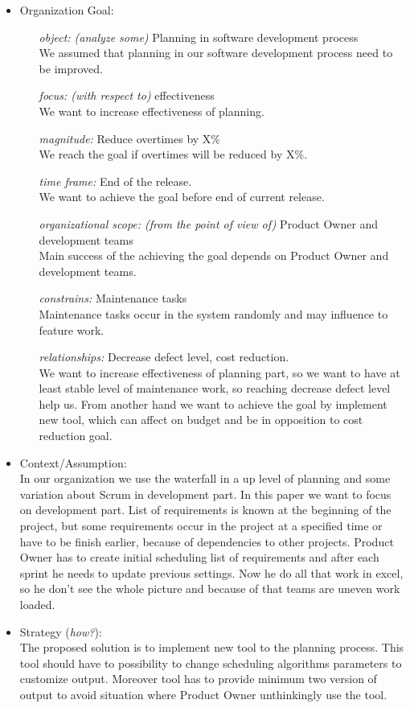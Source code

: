 \begin{itemize}
\item Organization Goal:
  \begin{itemize}
  \item[\textit{object: (analyze some)}] Planning in software development process \\
  We assumed that planning in our software development process need to be improved.
  \item[\textit{focus: (with respect to)}] effectiveness \\ We want to increase effectiveness of planning. 
  \item[\textit{magnitude:}] Reduce overtimes by X\% \\
  We reach the goal if overtimes will be reduced by X\%.
  \item[\textit{time frame:}] End of the release.\\
  We want to achieve the goal before end of current release.
  \item[\textit{organizational scope: (from the point of view of)}] Product Owner and development teams \\
  Main success of the achieving the goal depends on Product Owner and development teams.
  \item[\textit{constrains:}] Maintenance tasks \\
  Maintenance tasks occur in the system randomly and may influence to feature work.
  \item[\textit{relationships:}] Decrease defect level, cost reduction. \\
  We want to increase effectiveness of planning part, so we want to have at least stable level of maintenance work, so reaching decrease defect level help us. From another hand we want to achieve the goal by implement new tool, which can affect on budget and be in opposition to cost reduction goal.
  \end{itemize}
\item Context/Assumption: \\
In our organization we use the waterfall in a up level of planning and some variation about Scrum in development part. In this paper we want to focus on development part. List of requirements is known at the beginning of the project, but some requirements occur in the project at a specified time or have to be finish earlier, because of dependencies to other projects. Product Owner has to   create initial scheduling list of requirements and after each sprint he needs to update previous settings. Now he do all that work in excel, so he don't see the whole picture and because of that teams are uneven work loaded. 
\item Strategy (\textit{how?}):\\
The proposed solution is to implement new tool to the planning process. This tool should have to possibility to change scheduling algorithms parameters to customize output. Moreover tool has to provide minimum two version of output to avoid situation where Product Owner unthinkingly use the tool.
\end{itemize}

